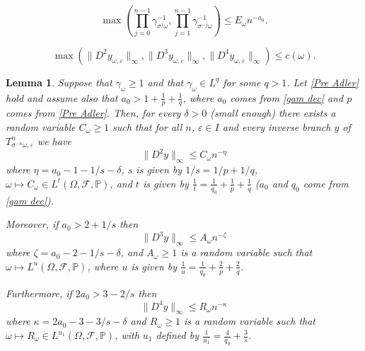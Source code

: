 \documentclass[10pt,a4paper]{amsart}
\newtheorem{lemma}{Lemma}
\def\om{\omega}
\begin{document}
\begin{equation}\label{gam dec}
\max\left(\prod_{j=0}^{n-1}\gamma_{\sigma^j\omega}^{-1},\prod_{j=1}^{n-1}\gamma_{\sigma^{-j}\omega}^{-1}\right)\leq  E_\omega n^{-a_0}.    
\end{equation}

\begin{equation}\label{Pre Adler}
\max(\|D^2 y_{\omega,\varepsilon}\|_\infty, \|D^3 y_{\omega,\varepsilon}\|_\infty, \|D^4 y_{\omega,\varepsilon}\|_\infty)\leq c(\omega).
\end{equation}

\begin{lemma}\label{Lemma 4}
Suppose that $\gamma_\omega\geq1$ and that $\gamma_\omega\in L^q$ for some $q>1$. Let   \eqref{Pre Adler} hold and
assume also that $a_0>1+\frac{1}{p}+\frac1{q}$, where $a_0$ comes from \eqref{gam dec} and $p$ comes from \eqref{Pre Adler}.
Then, for every $\delta>0$ (small enough) there exists a random variable $C_\omega\geq 1$ such that
for all $n$, $\varepsilon\in I$ and every inverse branch $y$ of $T_{\sigma^{-n}\omega,\varepsilon}^n$ we have 
\begin{equation}\label{11}
\|D^2y\|_\infty\leq C_\omega n^{-\eta}    
\end{equation}
where $\eta=a_0-1-1/s-\delta$,
$s$ is given by $1/s=1/p+1/q$,  $\omega\mapsto C_\omega\in L^{t}(\Omega,\mathcal F,\mathbb P)$, and $t$ is given by $\frac{1}{t}=\frac{1}{q_0}+\frac{1}{p}+\frac{1}{q}$ ($a_0$ and $q_0$ come from \eqref{gam dec}). 

Moreover, if $a_0>2+1/s$ then
\begin{equation}\label{12}
\|D^3y\|_\infty\leq A_\om n^{-\zeta}    
\end{equation}
where $\zeta=a_0-2-1/s-\delta$, 
and $A_\om\geq 1$ is a random variable such that $\om\mapsto L^u(\Omega, \mathcal F,\mathbb P)$, where $u$ is given by $\frac{1}u=\frac{1}{q_0}+\frac{2}{p}+\frac{2}{q}$.

Furthermore, if $2a_0>3-2/s$ then
\begin{equation}\label{13}
\|D^4y\|_{\infty}\leq R_\om n^{-\kappa}
\end{equation}
where $\kappa=2a_0-3-3/s-\delta$ and  $R_\om\geq1$ is 
a random variable
such that $\omega\mapsto R_\om\in L^{u_1}(\Omega,\mathcal F,\mathbb P)$, with $u_1$  defined by $\frac1{u_1}=\frac{4}{q_0}+\frac{3}{s}$. 
\end{lemma}
\end{document}
